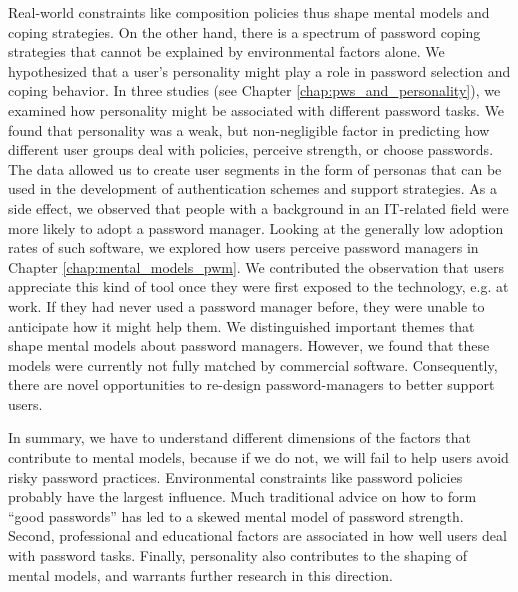 Real-world constraints like composition policies thus shape mental models and coping strategies. On the other hand, there is a spectrum of password coping strategies that cannot be explained by environmental factors alone. We hypothesized that a user's personality might play a role in password selection and coping behavior. In three studies (see Chapter \ref{chap:pws_and_personality}), we examined how personality might be associated with different password tasks. We found that personality was a weak, but non-negligible factor in predicting how different user groups deal with policies, perceive strength, or choose passwords. The data allowed us to create user segments in the form of personas that can be used in the development of authentication schemes and support strategies. 
As a side effect, we observed that people with a background in an IT-related field were more likely to adopt a password manager. Looking at the generally low adoption rates of such software, we explored how users perceive password managers in Chapter \ref{chap:mental_models_pwm}. We contributed the observation that users appreciate this kind of tool once they were first exposed to the technology, e.g. at work. If they had never used a password manager before, they were unable to anticipate how it might help them. We distinguished important themes that shape mental models about password managers. However, we found that these models were currently not fully matched by commercial software. Consequently, there are novel opportunities to re-design password-managers to better support users. 

In summary, we have to understand different dimensions of the factors that contribute to mental models, because if we do not, we will fail to help users avoid risky password practices. Environmental constraints like password policies probably have the largest influence. Much traditional advice on how to form ``good passwords'' has led to a skewed mental model of password strength. Second, professional and educational factors are associated in how well users deal with password tasks. Finally, personality also contributes to the shaping of mental models, and warrants further research in this direction. %

